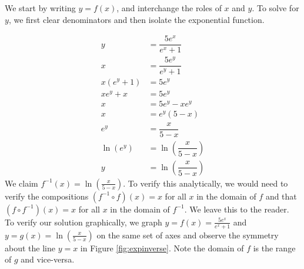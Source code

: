 {We start by writing $y=f(x)$, and interchange the roles of $x$ and $y$.  To solve for $y$, we first clear denominators and then isolate the exponential function.

\begin{align*}
y & =  \dfrac{5e^{x}}{e^{x}+1}  \\[3pt]
x & =  \dfrac{5e^{y}}{e^{y}+1}  \tag*{Switch $x$ and $y$} \\[3pt]
x \left(e^{y}+1\right) & =  5e^{y}  \\
x e^{y}+x & = 5e^{y} \\
x & =  5e^{y} - x e^{y}  \\
x & =  e^{y}(5 - x) \\
e^{y}& =  \dfrac{x}{5-x}  \\[3pt]
\ln\left(e^{y}\right) & =  \ln\left(\dfrac{x}{5-x}\right) \\[3pt]
y & =  \ln\left(\dfrac{x}{5-x}\right)
\end{align*}
We claim $f^{-1}(x) = \ln\left(\frac{x}{5-x}\right)$.  To verify this analytically, we would need to verify the compositions $\left(f^{-1} \circ f\right)(x) = x$ for all $x$ in the domain of $f$ and that $\left(f \circ f^{-1}\right)(x) = x$ for all $x$ in the domain of $f^{-1}$.  We leave this to the reader.  To verify our solution graphically, we graph $y = f(x) = \frac{5e^{x}}{e^{x}+1}$ and $y = g(x) = \ln\left(\frac{x}{5-x}\right)$ on the same set of axes and observe the symmetry about the line $y=x$ in Figure \ref{fig:expinverse}.  Note the domain of $f$ is the range of $g$ and vice-versa.

{}
}

